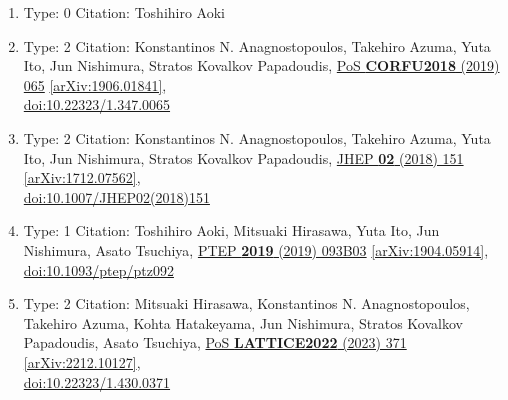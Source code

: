 \documentclass[a4paper,10pt]{article}
\begin{document}
\begin{enumerate}
\begin{enumerate}
  \item Type: 0 Citation: Toshihiro Aoki
  \item Type: 2 Citation: Konstantinos N. Anagnostopoulos, Takehiro Azuma, Yuta Ito, Jun Nishimura, Stratos Kovalkov Papadoudis, \href{https://www.doi.org/10.22323/1.347.0065}{PoS {\bf CORFU2018} (2019) 065}  \href{https://arxiv.org/abs/1906.01841}{[arXiv:1906.01841]},\\\href{https://www.doi.org/10.22323/1.347.0065}{doi:10.22323/1.347.0065}
  \item Type: 2 Citation: Konstantinos N. Anagnostopoulos, Takehiro Azuma, Yuta Ito, Jun Nishimura, Stratos Kovalkov Papadoudis, \href{https://www.doi.org/10.1007/JHEP02(2018)151}{JHEP {\bf 02} (2018) 151}  \href{https://arxiv.org/abs/1712.07562}{[arXiv:1712.07562]},\\\href{https://www.doi.org/10.1007/JHEP02(2018)151}{doi:10.1007/JHEP02(2018)151}
  \item Type: 1 Citation: Toshihiro Aoki, Mitsuaki Hirasawa, Yuta Ito, Jun Nishimura, Asato Tsuchiya, \href{https://www.doi.org/10.1093/ptep/ptz092}{PTEP {\bf 2019} (2019) 093B03}  \href{https://arxiv.org/abs/1904.05914}{[arXiv:1904.05914]},\\\href{https://www.doi.org/10.1093/ptep/ptz092}{doi:10.1093/ptep/ptz092}
  \item Type: 2 Citation: Mitsuaki Hirasawa, Konstantinos N. Anagnostopoulos, Takehiro Azuma, Kohta Hatakeyama, Jun Nishimura, Stratos Kovalkov Papadoudis, Asato Tsuchiya, \href{https://www.doi.org/10.22323/1.430.0371}{PoS {\bf LATTICE2022} (2023) 371}  \href{https://arxiv.org/abs/2212.10127}{[arXiv:2212.10127]},\\\href{https://www.doi.org/10.22323/1.430.0371}{doi:10.22323/1.430.0371}

\end{enumerate}
\end{enumerate}
\end{document}
